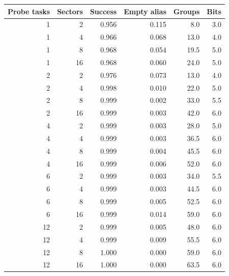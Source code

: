\begin{tabular}{rrrrrr}
\toprule
Probe tasks & Sectors & Success & Empty alias & Groups & Bits \\
\midrule
1 & 2 & 0.956 & 0.115 & 8.0 & 3.0 \\
1 & 4 & 0.966 & 0.068 & 13.0 & 4.0 \\
1 & 8 & 0.968 & 0.054 & 19.5 & 5.0 \\
1 & 16 & 0.968 & 0.060 & 24.0 & 5.0 \\
2 & 2 & 0.976 & 0.073 & 13.0 & 4.0 \\
2 & 4 & 0.998 & 0.010 & 22.0 & 5.0 \\
2 & 8 & 0.999 & 0.002 & 33.0 & 5.5 \\
2 & 16 & 0.999 & 0.003 & 42.0 & 6.0 \\
4 & 2 & 0.999 & 0.003 & 28.0 & 5.0 \\
4 & 4 & 0.999 & 0.003 & 36.5 & 6.0 \\
4 & 8 & 0.999 & 0.004 & 45.5 & 6.0 \\
4 & 16 & 0.999 & 0.006 & 52.0 & 6.0 \\
6 & 2 & 0.999 & 0.003 & 34.0 & 5.5 \\
6 & 4 & 0.999 & 0.003 & 44.5 & 6.0 \\
6 & 8 & 0.999 & 0.005 & 52.5 & 6.0 \\
6 & 16 & 0.999 & 0.014 & 59.0 & 6.0 \\
12 & 2 & 0.999 & 0.005 & 48.0 & 6.0 \\
12 & 4 & 0.999 & 0.009 & 55.5 & 6.0 \\
12 & 8 & 1.000 & 0.000 & 59.0 & 6.0 \\
12 & 16 & 1.000 & 0.000 & 63.5 & 6.0 \\
\bottomrule
\end{tabular}
